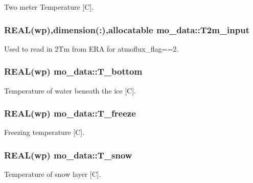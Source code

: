 Two meter Temperature \mbox{[}C\mbox{]}. 

\hypertarget{namespacemo__data_a8795a47a232696bffa9fa64a1f06a420}{
\subsubsection[{T2m\_\-input}]{\setlength{\rightskip}{0pt plus 5cm}REAL(wp),dimension(:),allocatable {\bf mo\_\-data::T2m\_\-input}}}
\label{namespacemo__data_a8795a47a232696bffa9fa64a1f06a420}


Used to read in 2Tm from ERA for atmoflux\_\-flag==2. 

\hypertarget{namespacemo__data_a2ac8e0a672ebfd49781702474bf4ba0e}{
\subsubsection[{T\_\-bottom}]{\setlength{\rightskip}{0pt plus 5cm}REAL(wp) {\bf mo\_\-data::T\_\-bottom}}}
\label{namespacemo__data_a2ac8e0a672ebfd49781702474bf4ba0e}


Temperature of water beneath the ice \mbox{[}C\mbox{]}. 

\hypertarget{namespacemo__data_a75b714d38b619ba4c6608d8f833cf159}{
\subsubsection[{T\_\-freeze}]{\setlength{\rightskip}{0pt plus 5cm}REAL(wp) {\bf mo\_\-data::T\_\-freeze}}}
\label{namespacemo__data_a75b714d38b619ba4c6608d8f833cf159}


Freezing temperature \mbox{[}C\mbox{]}. 

\hypertarget{namespacemo__data_a6d032201ee2f7b716badb13643daf93e}{
\subsubsection[{T\_\-snow}]{\setlength{\rightskip}{0pt plus 5cm}REAL(wp) {\bf mo\_\-data::T\_\-snow}}}
\label{namespacemo__data_a6d032201ee2f7b716badb13643daf93e}


Temperature of snow layer \mbox{[}C\mbox{]}. 

